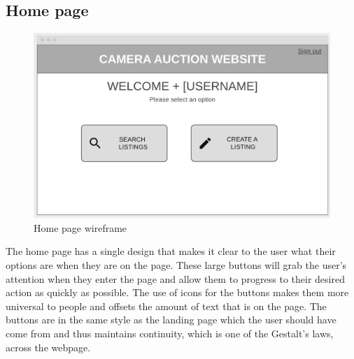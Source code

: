 \subsection{Home page}
\begin{figure}[H]
    \centering
    \includegraphics[scale=0.4]{ch2_design/wire_home.png}
    \caption{Home page wireframe }
    \label{fig:wire_home}
\end{figure}
The home page has a single design that makes it clear to the user what their options are when they are on the page. These large buttons will grab the user’s attention when they enter the page and allow them to progress to their desired action as quickly as possible. The use of icons for the buttons makes them more universal to people and offsets the amount of text that is on the page. The buttons are in the same style as the landing page which the user should have come from and thus maintains continuity, which is one of the Gestalt’s laws, across the webpage.


